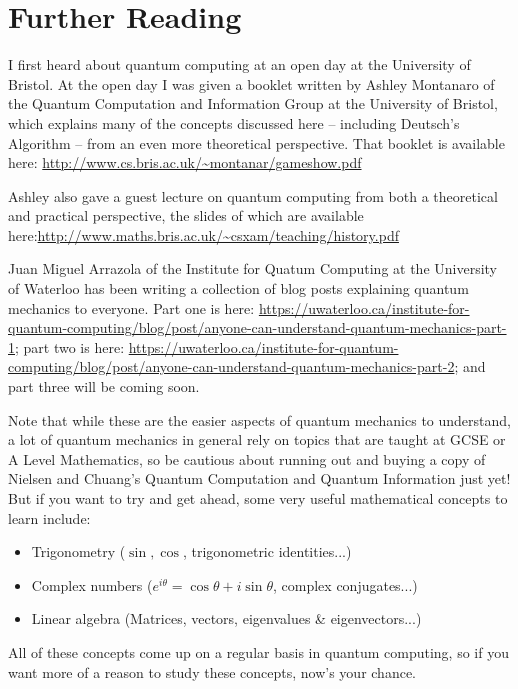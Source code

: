 \documentclass[twocolumn]{article}
\begin{document}
\section{Further Reading}

I first heard about quantum computing at an open day at the University of Bristol. At the open day I was given a booklet written by Ashley Montanaro of the Quantum Computation and Information Group at the University of Bristol, which explains many of the concepts discussed here -- including Deutsch's Algorithm -- from an even more theoretical perspective. That booklet is available here: \url{http://www.cs.bris.ac.uk/~montanar/gameshow.pdf}

Ashley also gave a guest lecture on quantum computing from both a theoretical and practical perspective, the slides of which are available here:\url{http://www.maths.bris.ac.uk/~csxam/teaching/history.pdf}

Juan Miguel Arrazola of the Institute for Quatum Computing at the University of Waterloo has been writing a collection of blog posts explaining quantum mechanics to everyone. Part one is here: \url{https://uwaterloo.ca/institute-for-quantum-computing/blog/post/anyone-can-understand-quantum-mechanics-part-1}; part two is here: \url{https://uwaterloo.ca/institute-for-quantum-computing/blog/post/anyone-can-understand-quantum-mechanics-part-2}; and part three will be coming soon.

Note that while these are the easier aspects of quantum mechanics to understand, a lot of quantum mechanics in general rely on topics that are taught at GCSE or A Level Mathematics, so be cautious about running out and buying a copy of Nielsen and Chuang's Quantum Computation and Quantum Information just yet! But if you want to try and get ahead, some very useful mathematical concepts to learn include:

\begin{itemize}
\item Trigonometry ($\sin, \cos$, trigonometric identities...)
\item Complex numbers ($e^{i\theta} = \cos\theta + i\sin\theta$, complex conjugates...)
\item Linear algebra (Matrices, vectors, eigenvalues \& eigenvectors...)
\end{itemize}

All of these concepts come up on a regular basis in quantum computing, so if you want more of a reason to study these concepts, now's your chance.
\end{document}
